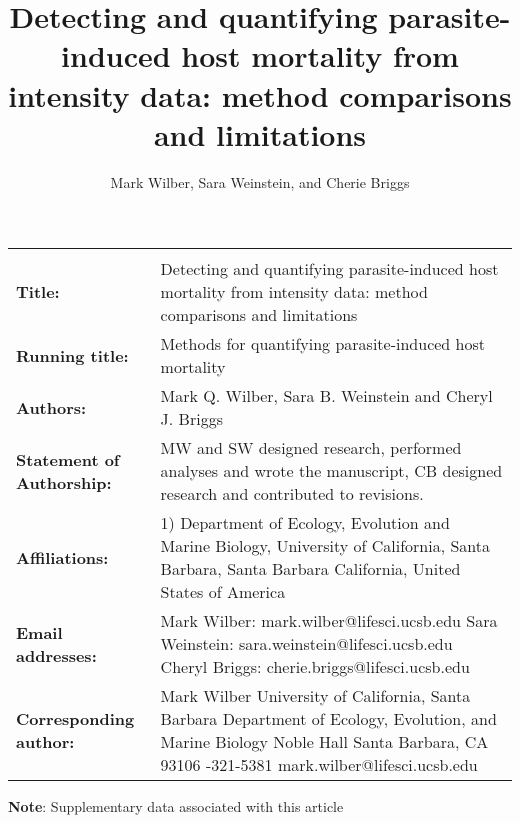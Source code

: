\documentclass[12pt, a4paper]{article}
\title{Detecting and quantifying parasite-induced host mortality from intensity data: method comparisons and limitations}
\author{Mark Wilber, Sara Weinstein, and Cherie Briggs}
\begin{document}
\setlength{\parindent}{0in}
\renewcommand{\arraystretch}{2}
\begin{tabular}{p{3cm} p{10cm}}

\large\textbf{} & \vspace\baselineskip \\

\textbf{Title:} & Detecting and quantifying parasite-induced host mortality from intensity data: method comparisons and limitations \\

\textbf{Running title:} & Methods for quantifying parasite-induced host mortality  \\

\textbf{Authors:} & Mark Q. Wilber, Sara B. Weinstein and Cheryl J. Briggs \\

\textbf{Statement of Authorship:} & MW and SW designed research, performed
analyses and wrote the manuscript, CB designed research and contributed to revisions. \\

\textbf{Affiliations:} &
1) Department of Ecology, Evolution and Marine Biology, University of California,
Santa Barbara, Santa Barbara California, United States of America \\

\textbf{Email addresses:} &
Mark Wilber: mark.wilber@lifesci.ucsb.edu \newline
Sara Weinstein: sara.weinstein@lifesci.ucsb.edu \newline
Cheryl Briggs: cherie.briggs@lifesci.ucsb.edu \\

\textbf{Corresponding \newline author:} &
Mark Wilber \newline
University of California, Santa Barbara \newline
Department of Ecology, Evolution, and Marine Biology \newline
2111 Noble Hall \newline
Santa Barbara, CA 93106 \newline
505-321-5381 \newline
mark.wilber@lifesci.ucsb.edu \newline


\end{tabular}

\textbf{Note}: Supplementary data associated with this article
\end{document}
